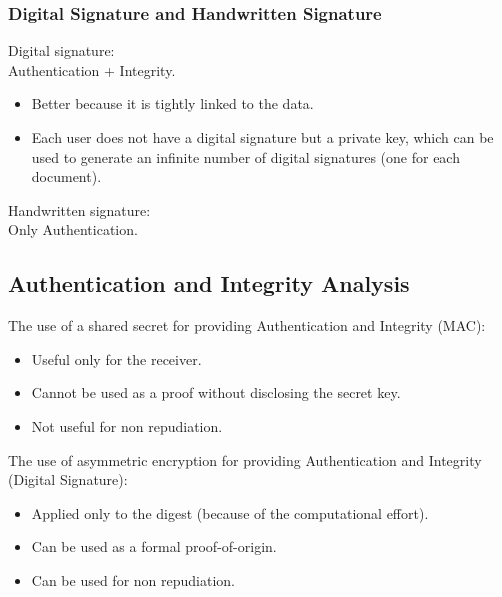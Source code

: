 \subsubsection*{Digital Signature and Handwritten Signature}
\begin{multicols}{2}

    Digital signature: \\ Authentication + Integrity.
    \begin{itemize}
        \item Better because it is tightly linked to the data.
        \item Each user does not have a digital signature but a private key, which can be used to generate an infinite number of digital signatures (one for each document).
    \end{itemize}
    \columnbreak

    

    Handwritten signature: \\ Only Authentication.
    
\end{multicols}

\subsection{Authentication and Integrity Analysis}


\begin{multicols}{2}

    The use of a shared secret for providing Authentication and Integrity (MAC):
    \begin{itemize}
        \item Useful only for the receiver.
        \item Cannot be used as a proof without disclosing the secret key.
        \item Not useful for non repudiation.
    \end{itemize}
\columnbreak

The use of asymmetric encryption for providing Authentication and Integrity (Digital Signature):
\begin{itemize}
    \item Applied only to the digest (because of the computational effort).
    \item Can be used as a formal proof-of-origin.
    \item Can be used for non repudiation.
\end{itemize}
\end{multicols}


